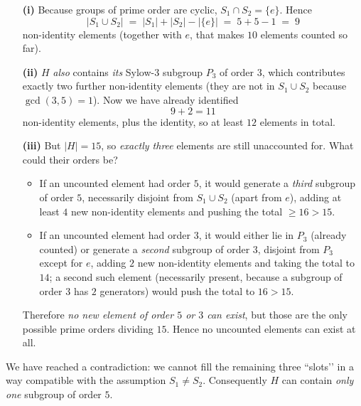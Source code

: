 \documentclass[12pt]{article}
\theoremstyle{definition} %
\theoremstyle{plain} %
\begin{document}
\begin{enumerate}
\item[\textbf{(i)}]  Because groups of prime order are cyclic,
      \(S_{1}\cap S_{2}=\{e\}\).
      Hence
      \[
          |S_{1}\cup S_{2}| \;=\;
          |S_{1}|+|S_{2}|-|\{e\}|
          \;=\; 5+5-1
          \;=\; 9
      \]
      non-identity elements
      (together with \(e\), that makes \(10\) elements counted so far).

\item[\textbf{(ii)}]  \(H\) \emph{also} contains \emph{its} Sylow-\(3\)
      subgroup \(P_{3}\) of order \(3\),
      which contributes exactly two further non-identity elements
      (they are not in \(S_{1}\cup S_{2}\) because
      \(\gcd(3,5)=1\)).
      Now we have already identified
      \[
          9 + 2 = 11
      \]
      non-identity elements,
      plus the identity,
      so at least \(12\) elements in total.

\item[\textbf{(iii)}]  But \(|H|=15\), so \emph{exactly three} elements
      are still unaccounted for.
      What could their orders be?

      \begin{itemize}
      \item If an uncounted element had order \(5\),
            it would generate a \emph{third} subgroup of order \(5\),
            necessarily disjoint from \(S_{1}\cup S_{2}\)
            (apart from \(e\)),
            adding at least \(4\) new non-identity elements
            and pushing the total \(\ge 16>15\).

      \item If an uncounted element had order \(3\),
            it would either lie in \(P_{3}\) (already counted)
            or generate a \emph{second} subgroup of order \(3\),
            disjoint from \(P_{3}\) except for \(e\),
            adding \(2\) new non-identity elements
            and taking the total to \(14\);
            a second such element (necessarily present,
            because a subgroup of order \(3\) has \(2\) generators)
            would push the total to \(16>15\).
      \end{itemize}

      Therefore \emph{no new element of order \(5\) or \(3\) can exist},
      but those are the only possible prime orders dividing \(15\).
      Hence no uncounted elements can exist at all.
\end{enumerate}

We have reached a contradiction:
we cannot fill the remaining three “slots’’ in a way compatible with
the assumption \(S_{1}\neq S_{2}\).
Consequently \(H\) can contain \emph{only one} subgroup of order \(5\).
\end{document}
